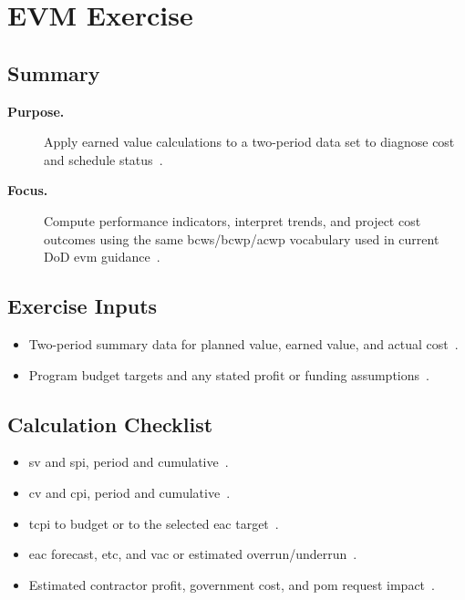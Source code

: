 \documentclass[../main.tex]{subfiles}
\begin{document}
\section{EVM Exercise}

\subsection{Summary}
\begin{description}
  \item[\textbf{Purpose.}] Apply earned value calculations to a two-period data set to diagnose cost and schedule status~\autocite{edo-3-6-3-evm-exercise-2025,DoD-IPM-EVM-Definitions-2026}.
  \item[\textbf{Focus.}] Compute performance indicators, interpret trends, and project cost outcomes using the same \ac{bcws}/\ac{bcwp}/\ac{acwp} vocabulary used in current DoD \ac{evm} guidance~\autocite{edo-3-6-3-evm-exercise-2025,DoD-IPM-EVM-Definitions-2026}.
\end{description}

\subsection{Exercise Inputs}
\begin{itemize}
  \item Two-period summary data for planned value, earned value, and actual cost~\autocite{edo-3-6-3-evm-exercise-2025}.
  \item Program budget targets and any stated profit or funding assumptions~\autocite{edo-3-6-3-evm-exercise-2025}.
\end{itemize}

\subsection{Calculation Checklist}
\begin{itemize}
  \item \ac{sv} and \ac{spi}, period and cumulative~\autocite{edo-3-6-3-evm-exercise-2025,DoD-IPM-EVM-Definitions-2026}.
  \item \ac{cv} and \ac{cpi}, period and cumulative~\autocite{edo-3-6-3-evm-exercise-2025,DoD-IPM-EVM-Definitions-2026}.
  \item \ac{tcpi} to budget or to the selected \ac{eac} target~\autocite{edo-3-6-3-evm-exercise-2025,DoD-IPM-EVM-Definitions-2026}.
  \item \ac{eac} forecast, \ac{etc}, and \ac{vac} or estimated overrun/underrun~\autocite{edo-3-6-3-evm-exercise-2025,DoD-IPM-EVM-Definitions-2026}.
  \item Estimated contractor profit, government cost, and \ac{pom} request impact~\autocite{edo-3-6-3-evm-exercise-2025}.
\end{itemize}
\end{document}
